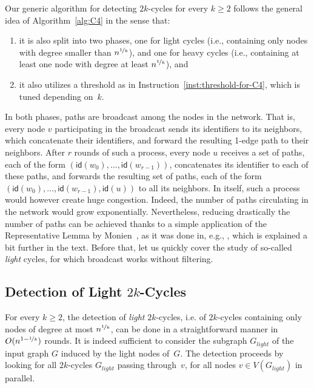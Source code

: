\documentclass{article}
\newcommand{\id}{\mathsf{id}}
\begin{document}
Our generic algorithm for detecting $2k$-cycles for every $k\geq 2$ follows the general idea of Algorithm~\ref{alg:C4} in the sense that:
\begin{enumerate}
    \item it is also split into two phases, one for light cycles (i.e., containing only nodes with degree smaller than $n^{\nicefrac{1}{k}}$), and one for heavy cycles (i.e., containing at least one node with degree at least $n^{\nicefrac{1}{k}}$), and
    \item it also utilizes a threshold as in Instruction~\ref{inst:threshold-for-C4}, which is tuned depending on~$k$. 
\end{enumerate}
In both phases, paths are broadcast among the nodes in the network. That is, every node $v$ participating in the broadcast sends its identifiers to its neighbors, which concatenate their identifiers, and forward the resulting 1-edge path to their neighbors. After $r$ rounds of such a process, every node $u$ receives a set of paths, each of the form $(\id(w_0),\dots,\id(w_{r-1}))$, concatenates its identifier to each of these paths, and forwards the resulting set of paths, each of the form $(\id(w_0),\dots,\id(w_{r-1}),\id(u))$ to all its neighbors. In itself, such a process would however create huge congestion. Indeed, the number of paths circulating in the network would grow exponentially. Nevertheless, reducing drastically the number of paths can  be achieved thanks to a simple application of the Representative Lemma by Monien~\cite{monien85}, as it was done in, e.g., \cite{FraigniaudO19,KorhonenR17}, which is explained a bit further in the text. Before that, let us quickly cover the study of so-called \emph{light} cycles, for which broadcast works without filtering. 

\subsection{Detection of Light $2k$-Cycles} 
\label{subsubsec:detection-light-cycles}

For every $k\geq 2$, the detection of \emph{light} $2k$-cycles, i.e. of $2k$-cycles containing only nodes of degree at most $n^{\nicefrac{1}{k}}$, can be done in a straightforward manner in $O(n^{1-\nicefrac{1}{k}})$ rounds. It is indeed sufficient to consider the subgraph $G_{light}$ of the input graph $G$ induced by the light nodes of~$G$. The detection proceeds by looking for all $2k$-cycles $G_{light}$ passing through~$v$, for all nodes $v\in V(G_{light})$ in parallel. 
\end{document}
